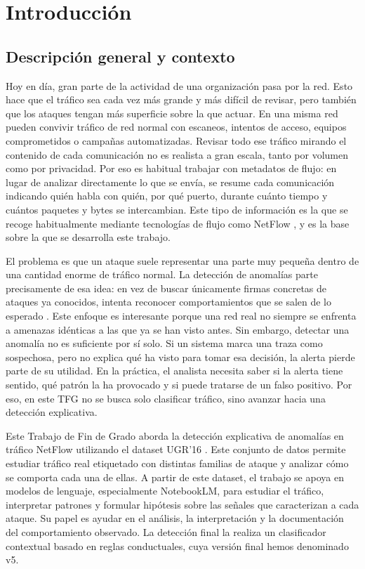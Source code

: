 \chapter{Introducción}
\label{cap:introduccion}

\section{Descripción general y contexto}
\label{sec:intro_contexto}

Hoy en día, gran parte de la actividad de una organización pasa por la red. Esto hace que el tráfico sea cada vez más grande y más difícil de revisar, pero también que los ataques tengan más superficie sobre la que actuar. En una misma red pueden convivir tráfico de red normal con escaneos, intentos de acceso, equipos comprometidos o campañas automatizadas. Revisar todo ese tráfico mirando el contenido de cada comunicación no es realista a gran escala, tanto por volumen como por privacidad. Por eso es habitual trabajar con metadatos de flujo: en lugar de analizar directamente lo que se envía, se resume cada comunicación indicando quién habla con quién, por qué puerto, durante cuánto tiempo y cuántos paquetes y bytes se intercambian. Este tipo de información es la que se recoge habitualmente mediante tecnologías de flujo como NetFlow \cite{rfc3954}, y es la base sobre la que se desarrolla este trabajo.

El problema es que un ataque suele representar una parte muy pequeña dentro de una cantidad enorme de tráfico normal. La detección de anomalías parte precisamente de esa idea: en vez de buscar únicamente firmas concretas de ataques ya conocidos, intenta reconocer comportamientos que se salen de lo esperado \cite{garciateodoro2009anomaly}. Este enfoque es interesante porque una red real no siempre se enfrenta a amenazas idénticas a las que ya se han visto antes. Sin embargo, detectar una anomalía no es suficiente por sí solo. Si un sistema marca una traza como sospechosa, pero no explica qué ha visto para tomar esa decisión, la alerta pierde parte de su utilidad. En la práctica, el analista necesita saber si la alerta tiene sentido, qué patrón la ha provocado y si puede tratarse de un falso positivo. Por eso, en este TFG no se busca solo clasificar tráfico, sino avanzar hacia una detección explicativa.

Este Trabajo de Fin de Grado aborda la detección explicativa de anomalías en tráfico NetFlow utilizando el dataset UGR'16 \cite{ugr16}. Este conjunto de datos permite estudiar tráfico real etiquetado con distintas familias de ataque y analizar cómo se comporta cada una de ellas. A partir de este dataset, el trabajo se apoya en modelos de lenguaje, especialmente NotebookLM, para estudiar el tráfico, interpretar patrones y formular hipótesis sobre las señales que caracterizan a cada ataque. Su papel es ayudar en el análisis, la interpretación y la documentación del comportamiento observado. La detección final la realiza un clasificador contextual basado en reglas conductuales, cuya versión final hemos denominado v5.


